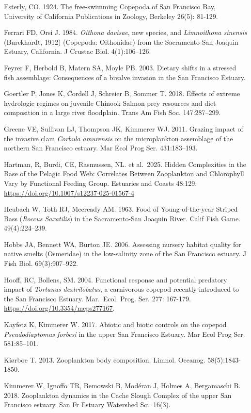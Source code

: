 \documentclass[
  letterpaper,
]{article}
\begin{document}
Esterly, CO. 1924. The free-swimming Copepoda of San Francisco Bay,
University of California Publications in Zoology, Berkeley 26(5):
81-129.

Ferrari FD, Orsi J. 1984. \emph{Oithona davisae}, new species, and
\emph{Limnoithona sinensis} (Burckhardt, 1912) (Copepoda: Oithonidae)
from the Sacramento-San Joaquin Estuary, California. J Crustac Biol.
4(1):106--126.

Feyrer F, Herbold B, Matern SA, Moyle PB. 2003. Dietary shifts in a
stressed fish assemblage: Consequences of a bivalve invasion in the San
Francisco Estuary.

Goertler P, Jones K, Cordell J, Schreier B, Sommer T. 2018. Effects of
extreme hydrologic regimes on juvenile Chinook Salmon prey resources and
diet composition in a large river floodplain. Trans Am Fish Soc.
147:287--299.

Greene VE, Sullivan LJ, Thompson JK, Kimmerer WJ. 2011. Grazing impact
of the invasive clam \emph{Corbula amurensis} on the microplankton
assemblage of the northern San Francisco estuary. Mar Ecol Prog Ser.
431:183--193.

Hartman, R, Burdi, CE, Rasmussen, NL. et al.~2025. Hidden Complexities
in the Base of the Pelagic Food Web: Correlates Between Zooplankton and
Chlorophyll Vary by Functional Feeding Group. Estuaries and Coasts
48:129. \url{https://doi.org/10.1007/s12237-025-01567-4}

Heubach W, Toth RJ, Mccready AM. 1963. Food of Young-of-the-year Striped
Bass (\emph{Roccus Saxatilis}) in the Sacramento-San Joaquin River.
Calif Fish Game. 49(4):224--239.

Hobbs JA, Bennett WA, Burton JE. 2006. Assessing nursery habitat quality
for native smelts (Osmeridae) in the low-salinity zone of the San
Francisco estuary. J Fish Biol. 69(3):907--922.

Hooff, RC, Bollens, SM. 2004. Functional response and potential
predatory impact of \emph{Tortanus dextrilobatus}, a carnivorous copepod
recently introduced to the San Francisco Estuary. Mar.~Ecol. Prog. Ser.
277: 167-179. \url{https://doi.org/10.3354/meps277167}.

Kayfetz K, Kimmerer W. 2017. Abiotic and biotic controls on the copepod
\emph{Pseudodiaptomus forbesi} in the upper San Francisco Estuary. Mar
Ecol Prog Ser. 581:85--101.

Kiørboe T. 2013. Zooplankton body composition. Limnol. Oceanog.
58(5):1843-1850.

Kimmerer W, Ignoffo TR, Bemowski B, Modéran J, Holmes A, Bergamaschi B.
2018. Zooplankton dynamics in the Cache Slough Complex of the upper San
Francisco estuary. San Fr Estuary Watershed Sci. 16(3).
\end{document}

